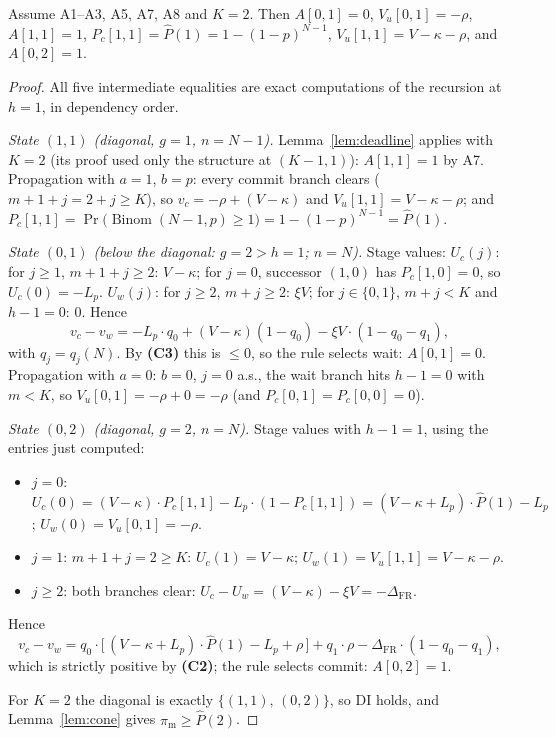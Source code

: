 \begin{lemma}[Rung-2 ignition for $K = 2$ --- with Lemma~\ref{lem:deadline}, proves part (iii)]\label{lem:rung2}
Assume A1--A3, A5, A7, A8 and $K = 2$. Then $A[0,1] = 0$, $V_u[0,1] = -\rho$, $A[1,1] = 1$, $P_c[1,1] = \widehat P(1) = 1 - (1-p)^{N-1}$, $V_u[1,1] = V - \kappa - \rho$, and $A[0,2] = 1$.
\end{lemma}

\begin{proof}
All five intermediate equalities are exact computations of the recursion at $h = 1$, in dependency order.

\emph{State $(1,1)$ (diagonal, $g = 1$, $n = N-1$).} Lemma~\ref{lem:deadline} applies with $K = 2$ (its proof used only the structure at $(K-1,1)$): $A[1,1] = 1$ by A7. Propagation with $a = 1$, $b = p$: every commit branch clears ($m+1+j = 2+j \ge K$), so $v_c = -\rho + (V-\kappa)$ and $V_u[1,1] = V - \kappa - \rho$; and $P_c[1,1] = \Pr\bigl(\operatorname{Binom}(N-1, p) \ge 1\bigr) = 1 - (1-p)^{N-1} = \widehat P(1)$.

\emph{State $(0,1)$ (below the diagonal: $g = 2 > h = 1$; $n = N$).} Stage values: $U_c(j)$: for $j \ge 1$, $m+1+j \ge 2$: $V - \kappa$; for $j = 0$, successor $(1,0)$ has $P_c[1,0] = 0$, so $U_c(0) = -L_p$. $U_w(j)$: for $j \ge 2$, $m+j \ge 2$: $\xi V$; for $j \in \{0,1\}$, $m+j < K$ and $h-1 = 0$: $0$. Hence
\[
v_c - v_w = -L_p \cdot q_0 + (V-\kappa)(1 - q_0) - \xi V \cdot (1 - q_0 - q_1),
\]
with $q_j = q_j(N)$. By \textbf{(C3)} this is $\le 0$, so the rule selects wait: $A[0,1] = 0$. Propagation with $a = 0$: $b = 0$, $j = 0$ a.s., the wait branch hits $h-1 = 0$ with $m < K$, so $V_u[0,1] = -\rho + 0 = -\rho$ (and $P_c[0,1] = P_c[0,0] = 0$).

\emph{State $(0,2)$ (diagonal, $g = 2$, $n = N$).} Stage values with $h-1 = 1$, using the entries just computed:
\begin{itemize}
\item $j = 0$: $U_c(0) = (V-\kappa)\cdot P_c[1,1] - L_p \cdot (1 - P_c[1,1]) = (V-\kappa+L_p)\cdot \widehat P(1) - L_p$; \; $U_w(0) = V_u[0,1] = -\rho$.
\item $j = 1$: $m+1+j = 2 \ge K$: $U_c(1) = V - \kappa$; \; $U_w(1) = V_u[1,1] = V - \kappa - \rho$.
\item $j \ge 2$: both branches clear: $U_c - U_w = (V-\kappa) - \xi V = -\Delta_{\mathrm{FR}}$.
\end{itemize}
Hence
\[
v_c - v_w = q_0 \cdot \bigl[\, (V-\kappa+L_p)\cdot \widehat P(1) - L_p + \rho \,\bigr] + q_1 \cdot \rho - \Delta_{\mathrm{FR}} \cdot (1 - q_0 - q_1),
\]
which is strictly positive by \textbf{(C2)}; the rule selects commit: $A[0,2] = 1$.

For $K = 2$ the diagonal is exactly $\{(1,1),\, (0,2)\}$, so DI holds, and Lemma~\ref{lem:cone} gives $\pi_{\mathrm{m}} \ge \widehat P(2)$.
\end{proof}

